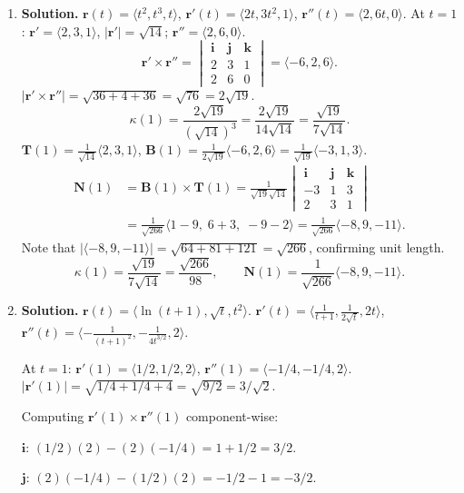 \begin{enumerate}
\item \textbf{Solution.}
$\mathbf{r}(t)=\langle t^2, t^3, t\rangle$, $\mathbf{r}'(t)=\langle 2t, 3t^2, 1\rangle$, $\mathbf{r}''(t)=\langle 2, 6t, 0\rangle$.
At $t=1$: $\mathbf{r}'=\langle 2,3,1\rangle$, $|\mathbf{r}'|=\sqrt{14}$; $\mathbf{r}''=\langle 2,6,0\rangle$.
\[
\mathbf{r}'\times\mathbf{r}''=\begin{vmatrix}\mathbf{i}&\mathbf{j}&\mathbf{k}\\2&3&1\\2&6&0\end{vmatrix}=\langle -6, 2, 6\rangle.
\]
$|\mathbf{r}'\times\mathbf{r}''|=\sqrt{36+4+36}=\sqrt{76}=2\sqrt{19}$.
\[
\kappa(1)=\frac{2\sqrt{19}}{(\sqrt{14})^3}=\frac{2\sqrt{19}}{14\sqrt{14}}=\frac{\sqrt{19}}{7\sqrt{14}}.
\]
$\mathbf{T}(1)=\frac{1}{\sqrt{14}}\langle 2,3,1\rangle$, $\mathbf{B}(1)=\frac{1}{2\sqrt{19}}\langle -6,2,6\rangle=\frac{1}{\sqrt{19}}\langle -3,1,3\rangle$.
\begin{align*}
\mathbf{N}(1) &= \mathbf{B}(1)\times\mathbf{T}(1)
= \frac{1}{\sqrt{19}\sqrt{14}}\begin{vmatrix}\mathbf{i}&\mathbf{j}&\mathbf{k}\\-3&1&3\\2&3&1\end{vmatrix} \\
&= \frac{1}{\sqrt{266}}\langle 1-9,\; 6+3,\; -9-2\rangle
= \frac{1}{\sqrt{266}}\langle -8,9,-11\rangle.
\end{align*}
Note that $|\langle -8,9,-11\rangle|=\sqrt{64+81+121}=\sqrt{266}$, confirming unit length.
\[
\boxed{\kappa(1)=\frac{\sqrt{19}}{7\sqrt{14}}=\frac{\sqrt{266}}{98}, \qquad \mathbf{N}(1)=\frac{1}{\sqrt{266}}\langle -8,9,-11\rangle.}
\]

\item \textbf{Solution.}
$\mathbf{r}(t)=\langle \ln(t+1), \sqrt{t}, t^2\rangle$.
$\mathbf{r}'(t)=\langle \frac{1}{t+1}, \frac{1}{2\sqrt{t}}, 2t\rangle$, $\mathbf{r}''(t)=\langle -\frac{1}{(t+1)^2}, -\frac{1}{4t^{3/2}}, 2\rangle$.

At $t=1$: $\mathbf{r}'(1)=\langle 1/2, 1/2, 2\rangle$, $\mathbf{r}''(1)=\langle -1/4, -1/4, 2\rangle$.
$|\mathbf{r}'(1)|=\sqrt{1/4+1/4+4}=\sqrt{9/2}=3/\sqrt{2}$.

Computing $\mathbf{r}'(1)\times\mathbf{r}''(1)$ component-wise:

$\mathbf{i}$: $(1/2)(2)-(2)(-1/4)=1+1/2=3/2$.

$\mathbf{j}$: $(2)(-1/4)-(1/2)(2)=-1/2-1=-3/2$.


\end{enumerate}
